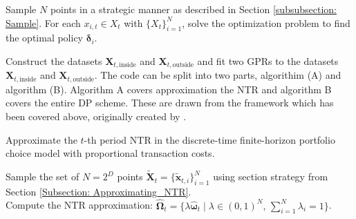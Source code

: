 \documentclass[11pt]{article}
\begin{document}
Sample $N$ points in a strategic manner as described in Section \ref{subsubsection: Sample}. For each $x_{i,t} \in X_{t}$ with $\{ X_t \}^{N}_{i=1}$,
solve the optimization problem to find the optimal policy $\boldsymbol{\delta}_{i}$.

Construct the datasets $\mathbf{X}_{t,\text{inside}}$ and $\mathbf{X}_{t,\text{outside}}$ and fit two \ac{GPR}s to the datasets $\mathbf{X}_{t,\text{inside}}$ and $\mathbf{X}_{t,\text{outside}}$.
The code can be split into two parts, algorithim (A) and algorithm (B). Algorithm A covers approximation the NTR and algorithm B covers the entire \ac{DP} scheme.
These are drawn from the framework which has been covered above, originally created by \autocite{Scheidegger2023}.

\begin{tcolorbox}[algobox]
\scriptsize{
\begin{algorithm}[H]
  \caption{Approximate the $t$-th period NTR in the discrete-time finite-horizon portfolio choice model with proportional transaction costs.}
  Sample the set of $N = 2^D$ points $\tilde{\mathbf{X}}_t = \{\tilde{\mathbf{x}}_{t,i}\}_{i=1}^N$ using section strategy from Section \ref{Subsection: Approximating_NTR}.\\
  Compute the NTR approximation: $\hat{\boldsymbol{\Omega}}_t = \{\lambda \hat{\boldsymbol{\omega}}_t \mid \lambda \in (0,1)^N, \, \sum_{i=1}^N \lambda_i = 1\}$.
\end{algorithm}
}
\end{tcolorbox}
\end{document}
